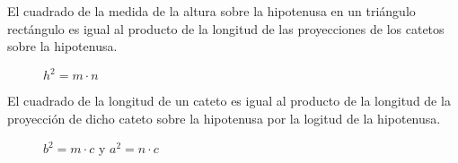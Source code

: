 \clearpage

\begin{theorem}
    El cuadrado de la medida de la altura sobre la hipotenusa en un triángulo rectángulo es igual al producto de la longitud de las proyecciones de los catetos sobre la hipotenusa.

    \begin{figure}[!h]
        \centering
        
        \caption{$h^2 = m \cdot n$}
        \label{fig:projection-hypothenuse-theorem}
    \end{figure}    
    
\end{theorem}

\begin{theorem}
    El cuadrado de la longitud de un cateto es igual al producto de la longitud de la proyección de dicho cateto sobre la hipotenusa por la logitud de la hipotenusa.

    \begin{figure}[!h]
        \centering
        
        \caption{$b^2 = m \cdot c$ y $a^2 = n \cdot c$}
        \label{fig:theorem-leg-hypothenuse-projection}
    \end{figure}    
    
\end{theorem}